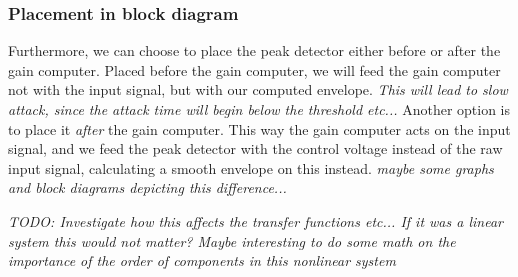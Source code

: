 \documentclass[]{article}
\begin{document}
\subsubsection{Placement in block diagram}
Furthermore, we can choose to place the peak detector either before or after the gain computer. Placed before the gain computer, we will feed the gain computer not with the input signal, but with our computed envelope. \emph{This will lead to slow attack, since the attack time will begin below the threshold etc...}
Another option is to place it \emph{after} the gain computer. This way the gain computer acts on the input signal, and we feed the peak detector with the control voltage instead of the raw input signal, calculating a smooth envelope on this instead. \emph{maybe some graphs and block diagrams depicting this difference...}

\emph{TODO: Investigate how this affects the transfer functions etc... If it was a linear system this would not matter? Maybe interesting to do some math on the importance of the order of components in this nonlinear system}



\end{document}
